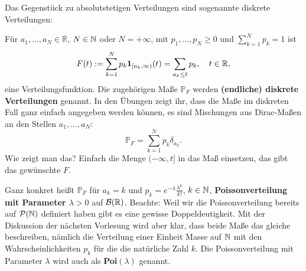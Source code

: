 Das Gegenst\"uck zu absolutstetigen Verteilungen sind sogenannte diskrete Verteilungen:	
\begin{beispiel}\label{Poi}
	Für $a_1,...,a_N \in \mathbb{R}$, $N\in \mathbb{N}$ oder $N=+\infty$, mit $p_1,...,p_N \geq 0$ und $\sum\limits_{k= 1}^{N} p_k= 1$ ist \[F(t):= \sum\limits_{k= 1}^{N} p_k \mathbf{1}_{[a_k, \infty)}(t)=\sum_{a_k\leq t} p_k, \quad t\in\mathbb{R}, \] eine Verteilungsfunktion. Die zugeh\"origen Ma\ss e $\mathbb P_F$ werden \textbf{(endliche) diskrete Verteilungen} genannt. In den \"Ubungen zeigt ihr, dass die Ma\ss e im diskreten Fall ganz einfach angegeben werden k\"onnen, es sind Mischungen aus Dirac-Ma\ss en an den Stellen $a_1,...,a_N$: $$\mathbb P_F=\sum_{k=1}^N p_k\delta_{a_k}.$$ Wie zeigt man das? Einfach die Menge $(-\infty,t]$ in das Ma\ss{} einsetzen, das gibt das gew\"unschte $F$.
	\begin{center}	
\end{center}
	Ganz konkret heißt $\mathbb{P}_F$ für $a_k=k$ und $p_k = e^{-\lambda} \frac{\lambda^k}{k!}$, $k \in \mathbb{N}$, \textbf{Poissonverteilung mit Parameter $\lambda>0$} auf $\mathcal{B}(\mathbb{R})$. Beachte: Weil wir die Poissonverteilung bereits auf $\mathcal P(\mathbb{N})$ definiert haben gibt es eine gewisse Doppeldeutigkeit. Mit der Diskussion der n\"achsten Vorlesung wird aber klar, dass beide Ma\ss e das gleiche beschreiben, n\"amlich die Verteilung einer Einheit Masse auf $\mathbb{N}$ mit den Wahrscheinlichkeiten $p_k$ f\"ur die die nat\"urliche Zahl $k$. Die Poissonverteilung mit Parameter $\lambda$ wird auch als \textbf{Poi$(\lambda)$} genannt.

\end{beispiel}
